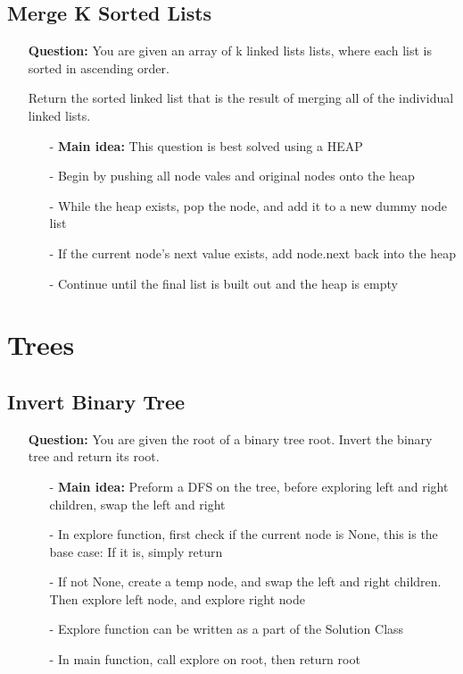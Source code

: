 \documentclass[12pt]{article}
\begin{document}
\subsection{Merge K Sorted Lists}
\begin{enumerate}
  \item[] \textbf{Question:} You are given an array of k linked lists lists, where each list is sorted in ascending order.

Return the sorted linked list that is the result of merging all of the individual linked lists.

    \begin{enumerate}
      \item[-] \textbf{Main idea:} This question is best solved using a HEAP
      \item[-] Begin by pushing all node vales and original nodes onto the heap
      \item[-] While the heap exists, pop the node, and add it to a new dummy node list
      \item[-] If the current node's next value exists, add node.next back into the heap
      \item[-] Continue until the final list is built out and the heap is empty

    \end{enumerate}
\end{enumerate}




\section{Trees}

\subsection{Invert Binary Tree}
\begin{enumerate}
  \item[] \textbf{Question:} You are given the root of a binary tree root. Invert the binary tree and return its root. 

    \begin{enumerate}
      \item[-] \textbf{Main idea:} Preform a DFS on the tree, before exploring left and right children, swap the left and right 
      \item[-] In explore function, first check if the current node is None, this is the base case: If it is, simply return 
      \item[-] If not None, create a temp node, and swap the left and right children. Then explore left node, and explore right node
      \item[-] Explore function can be written as a part of the Solution Class
      \item[-] In main function, call explore on root, then return root


    \end{enumerate}
\end{enumerate}
\end{document}
